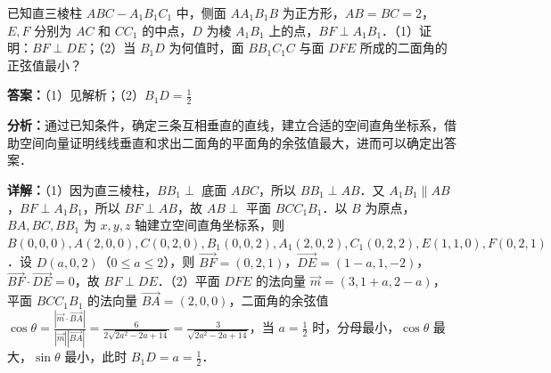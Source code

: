 \begin{question}[points=12]
已知直三棱柱 $ABC-A_1B_1C_1$ 中，侧面 $AA_1B_1B$ 为正方形，$AB=BC=2$，$E, F$ 分别为 $AC$ 和 $CC_1$ 的中点，$D$ 为棱 $A_1B_1$ 上的点，$BF \perp A_1B_1$．（1）证明：$BF \perp DE$；（2）当 $B_1D$ 为何值时，面 $BB_1C_1C$ 与面 $DFE$ 所成的二面角的正弦值最小？
\begin{solution}
\textbf{答案：}（1）见解析；（2）$B_1D = \frac{1}{2}$

\textbf{分析：}通过已知条件，确定三条互相垂直的直线，建立合适的空间直角坐标系，借助空间向量证明线线垂直和求出二面角的平面角的余弦值最大，进而可以确定出答案．

\textbf{详解：}（1）因为直三棱柱，$BB_1 \perp$ 底面 $ABC$，所以 $BB_1 \perp AB$．又 $A_1B_1 \parallel AB$，$BF \perp A_1B_1$，所以 $BF \perp AB$，故 $AB \perp$ 平面 $BCC_1B_1$．以 $B$ 为原点，$BA, BC, BB_1$ 为 $x, y, z$ 轴建立空间直角坐标系，则 $B(0,0,0), A(2,0,0), C(0,2,0), B_1(0,0,2), A_1(2,0,2), C_1(0,2,2), E(1,1,0), F(0,2,1)$．设 $D(a,0,2)$（$0\le a\le 2$），则 $\overrightarrow{BF}=(0,2,1)$，$\overrightarrow{DE}=(1-a,1,-2)$，$\overrightarrow{BF}\cdot\overrightarrow{DE}=0$，故 $BF \perp DE$．（2）平面 $DFE$ 的法向量 $\vec{m}=(3,1+a,2-a)$，平面 $BCC_1B_1$ 的法向量 $\overrightarrow{BA}=(2,0,0)$，二面角的余弦值 $\cos\theta = \frac{|\vec{m}\cdot\overrightarrow{BA}|}{|\vec{m}||\overrightarrow{BA}|} = \frac{6}{2\sqrt{2a^2-2a+14}} = \frac{3}{\sqrt{2a^2-2a+14}}$，当 $a=\frac{1}{2}$ 时，分母最小，$\cos\theta$ 最大，$\sin\theta$ 最小，此时 $B_1D = a = \frac{1}{2}$．
\end{solution}
\end{question}

